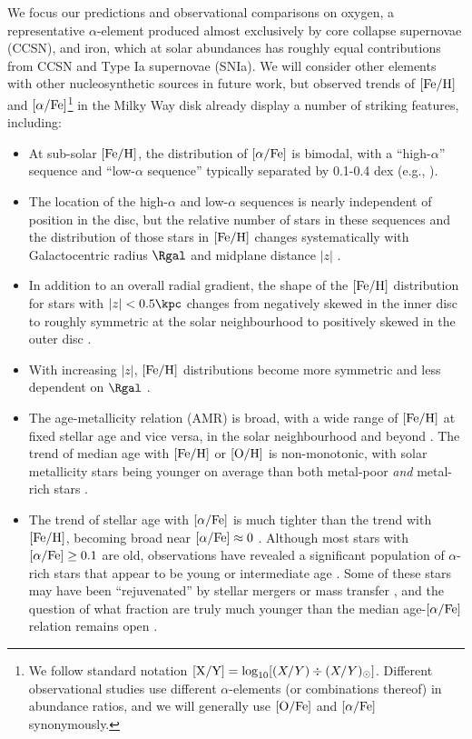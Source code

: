 We focus our predictions and observational comparisons on oxygen, a 
representative $\alpha$-element produced almost exclusively by core
collapse supernovae (CCSN), and iron, which at solar abundances has
roughly equal contributions from CCSN and Type Ia supernovae (SNIa).
We will consider other elements with other nucleosynthetic sources in
future work, but observed trends of $[{\rm Fe}/{\rm H}]$ and 
$[\alpha/{\rm Fe}]$\footnote{We follow standard
notation $[{\rm X}/{\rm Y}] = \log_{10}[(X/Y)\div (X/Y)_\odot]$.  Different
observational studies use different $\alpha$-elements (or combinations
thereof) in abundance ratios, and we will generally use $[{\rm O}/{\rm Fe}]$ and $[\alpha/{\rm Fe}]$
synonymously.} 
in the Milky Way disk already display a number of striking features, including:
\begin{itemize}
\item At sub-solar $[{\rm Fe}/{\rm H}]$, the distribution of $[\alpha/{\rm Fe}]$ is bimodal, with a
  ``high-$\alpha$'' sequence and ``low-$\alpha$ sequence'' typically
  separated by 0.1-0.4 dex (e.g., 
  \citealt{Furhmann1998,Bensby2003,Adibekyan2012,Vincenzo2021}).
\item The location of the high-$\alpha$ and low-$\alpha$ sequences is nearly
  independent of position in the disc, but the relative number of stars
  in these sequences and the distribution of those stars in $[{\rm Fe}/{\rm H}]$ changes
  systematically with Galactocentric radius $\Rgal$ and midplane distance $|z|$
  \citep{Nidever2014,Hayden2015,Weinberg2019}.
\item In addition to an overall radial gradient, the shape of the $[{\rm Fe}/{\rm H}]$
  distribution for stars with $|z|<0.5\kpc$ changes from negatively skewed
  in the inner disc to roughly symmetric at the solar neighbourhood to
  positively skewed in the outer disc \citep{Hayden2015,Weinberg2019}.
\item With increasing $|z|$, $[{\rm Fe}/{\rm H}]$ distributions become more symmetric
  and less dependent on $\Rgal$ \citep{Hayden2015}.
\item The age-metallicity relation (AMR) is broad, with a wide range of
  $[{\rm Fe}/{\rm H}]$ at fixed stellar age and vice versa, in the solar neighbourhood
  \citep{Edvardsson1993} and beyond \citep{Feuillet2019}.  The trend of
  median age with $[{\rm Fe}/{\rm H}]$ or $[{\rm O}/{\rm H}]$ is non-monotonic, with solar metallicity
  stars being younger on average than both metal-poor {\it and} metal-rich
  stars \citep{Feuillet2018,Feuillet2019}.
\item The trend of stellar age with $[\alpha/{\rm Fe}]$ is much tighter than the trend
  with $[{\rm Fe}/{\rm H}]$, becoming broad near $[\alpha/{\rm Fe}] \approx 0$ 
  \citep{Feuillet2018,Feuillet2019}.  Although most stars with $[\alpha/{\rm Fe}] \geq 0.1$
  are old, observations have revealed a significant population of
  $\alpha$-rich stars that appear to be young or intermediate age
  \citep{Chiappini2015,Martig2015,Warfield2021}.  Some of these stars
  may have been ``rejuvenated'' by stellar mergers or mass transfer 
  \citep{Izzard2018}, and the question of what fraction are truly much
  younger than the median age-$[\alpha/{\rm Fe}]$ relation remains open \citep{Hekker2019}.
\end{itemize}
